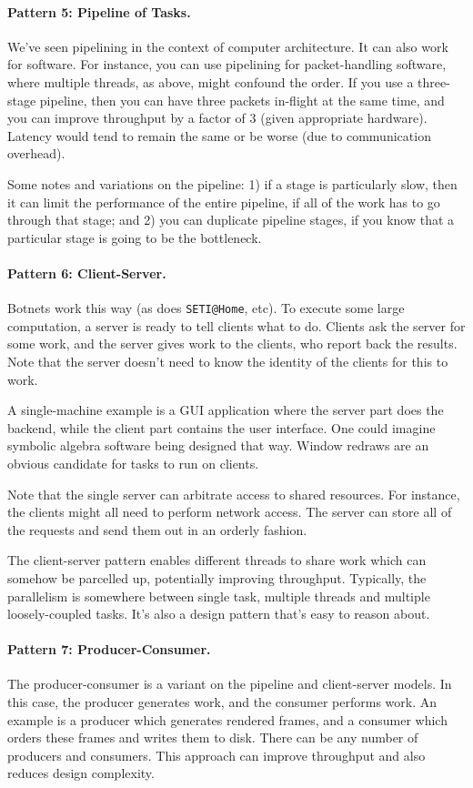 \documentclass[a4paper]{report}
\begin{document}
\paragraph{Pattern 5: Pipeline of Tasks.} We've seen pipelining in the context of
computer architecture. It can also work for software. For instance,
you can use pipelining for packet-handling software, where multiple
threads, as above, might confound the order. If you use a three-stage
pipeline, then you can have three packets in-flight at the same time,
and you can improve throughput by a factor of 3 (given appropriate
hardware).  Latency would tend to remain the same or be worse (due to
communication overhead).

Some notes and variations on the pipeline: 1) if a stage is
particularly slow, then it can limit the performance of the entire
pipeline, if all of the work has to go through that stage; and 2) you
can duplicate pipeline stages, if you know that a particular stage is
going to be the bottleneck.

\paragraph{Pattern 6: Client-Server.} Botnets work this way (as does \verb+SETI@Home+,
etc). To execute some large computation, a server is ready to tell
clients what to do.  Clients ask the server for some work, and the
server gives work to the clients, who report back the results. Note
that the server doesn't need to know the identity of the clients for
this to work.

A single-machine example is a GUI application where the server part
does the backend, while the client part contains the user interface.
One could imagine symbolic algebra software being designed that way.
Window redraws are an obvious candidate for tasks to run on clients.

Note that the single server can arbitrate access to shared resources.
For instance, the clients might all need to perform network access.
The server can store all of the requests and send them out in an
orderly fashion.

The client-server pattern enables different threads to share work
which can somehow be parcelled up, potentially improving
throughput. Typically, the parallelism is somewhere between single
task, multiple threads and multiple loosely-coupled tasks. It's also a
design pattern that's easy to reason about.

\paragraph{Pattern 7: Producer-Consumer.} The producer-consumer is 
a variant on the pipeline and client-server models. In this case, the
producer generates work, and the consumer performs work. An example is
a producer which generates rendered frames, and a consumer which
orders these frames and writes them to disk. There can be any number
of producers and consumers. This approach can improve throughput
and also reduces design complexity.
\end{document}
